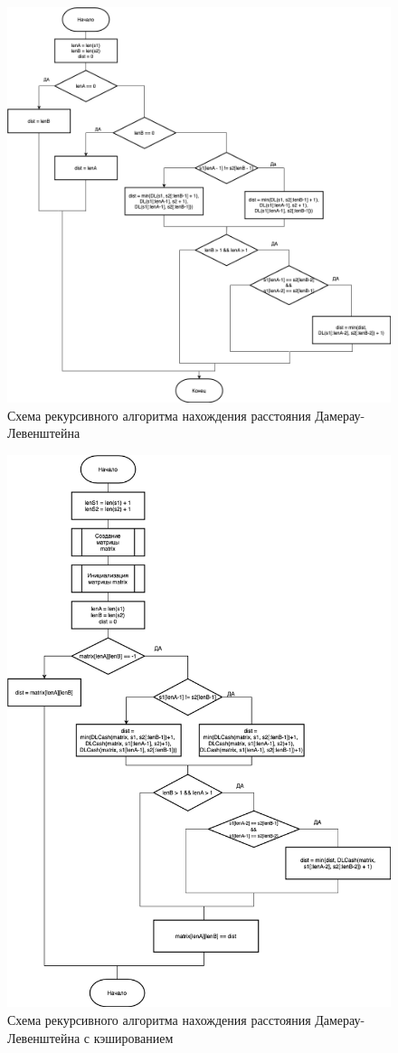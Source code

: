 \begin{figure}[h]
	\centering
	\includegraphics[width=1\linewidth]{img/DLR.png}
	\caption{Схема рекурсивного алгоритма нахождения расстояния Дамерау-Левенштейна}
	\label{fig:mpr}
\end{figure}

\clearpage

\begin{figure}[h]
	\centering
	\includegraphics[width=0.8\linewidth]{img/DLC.png}
	\caption{Схема рекурсивного алгоритма нахождения расстояния Дамерау-Левенштейна с кэшированием}
	\label{fig:mpr}
\end{figure}

